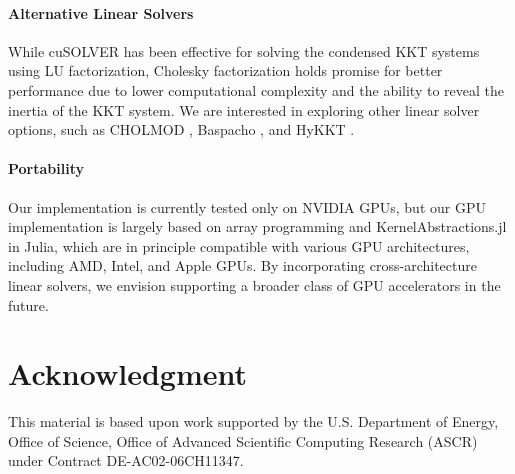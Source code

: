 \documentclass{IEEEtran4PSCC} %
\begin{document}
\paragraph*{Alternative Linear Solvers}
While cuSOLVER has been effective for solving the condensed KKT
systems using LU factorization, Cholesky factorization holds promise
for better performance due to lower computational complexity and the
ability to reveal the inertia of the KKT system. We are
interested in exploring other linear solver options, such as CHOLMOD
\cite{chen2008algorithm}, Baspacho \cite{pineda2022theseus}, and HyKKT
\cite{regev2023hykkt}.

\paragraph*{Portability}
Our implementation is currently  tested only on NVIDIA GPUs, but our
GPU implementation is largely based on array programming and
KernelAbstractions.jl in Julia, which are in principle  compatible with
various GPU architectures, including AMD, Intel, and Apple GPUs. By
incorporating cross-architecture linear solvers, we envision
supporting a broader class of GPU accelerators in the future.


\section*{Acknowledgment}
This material is based upon work supported by the U.S. Department of Energy, Office of Science, Office of Advanced Scientific Computing Research (ASCR) under Contract DE-AC02-06CH11347.



\vspace{0.1cm}
\begin{flushright}
  \scriptsize {}
  \normalsize
\end{flushright}
\end{document}
